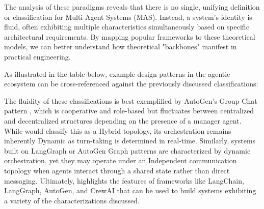 The analysis of these paradigms reveals that there is no single, unifying definition or classification for Multi-Agent Systems (MAS). Instead, a system’s identity is fluid, often exhibiting multiple characteristics simultaneously based on specific architectural requirements. By mapping popular frameworks to these theoretical models, we can better understand how theoretical "backbones" manifest in practical engineering.

As illustrated in the table below, example design patterns in the agentic ecosystem can be cross-referenced against the previously discussed classifications:
\begin{table}[h]
\centering
{}
\caption{Mapping of Multi-Agent patterns to theoretical classifications.}
\end{table}

The fluidity of these classifications is best exemplified by AutoGen's Group Chat pattern \citep{autogen_groupchat_pattern}, which is cooperative and role-based but fluctuates between centralized and decentralized structures depending on the presence of a manager agent. 
While \citet{kim2025sciencescalingagentsystems} would classify this as a Hybrid topology, its orchestration remains inherently Dynamic as turn-taking is determined in real-time. 
Similarly, systems built on LangGraph or AutoGen Graph patterns are characterized by dynamic orchestration, yet they may operate under an Independent communication topology when agents interact through a shared state rather than direct messaging. 
Ultimately, \citet{derouiche2025agenticaiframeworksarchitectures} highlights the features of frameworks like LangChain, LangGraph, AutoGen, and CrewAI that can be used to build systems exhibiting a variety of the characterizations discussed.

